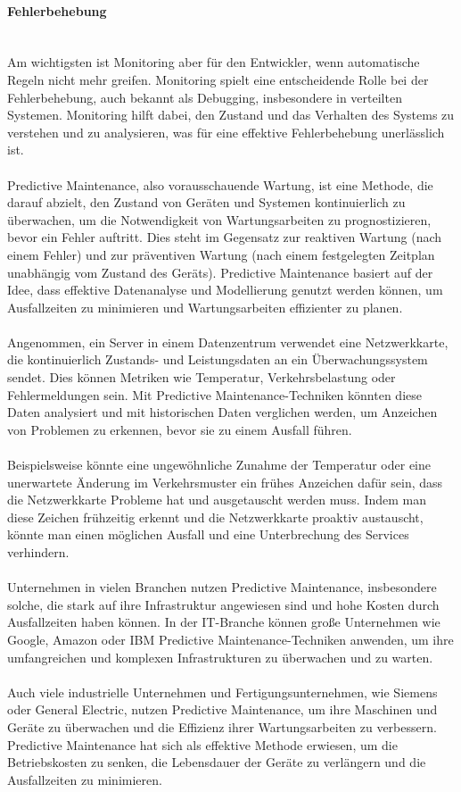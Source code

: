 \paragraph{Fehlerbehebung\\\\}
Am wichtigsten ist Monitoring aber für den Entwickler, wenn automatische Regeln nicht mehr greifen. Monitoring spielt eine entscheidende Rolle bei der Fehlerbehebung, auch bekannt als Debugging, insbesondere in verteilten Systemen. Monitoring hilft dabei, den Zustand und das Verhalten des Systems zu verstehen und zu analysieren, was für eine effektive Fehlerbehebung unerlässlich ist.
\\\\
Predictive Maintenance, also vorausschauende Wartung, ist eine Methode, die darauf abzielt, den Zustand von Geräten und Systemen kontinuierlich zu überwachen, um die Notwendigkeit von Wartungsarbeiten zu prognostizieren, bevor ein Fehler auftritt. Dies steht im Gegensatz zur reaktiven Wartung (nach einem Fehler) und zur präventiven Wartung (nach einem festgelegten Zeitplan unabhängig vom Zustand des Geräts). Predictive Maintenance basiert auf der Idee, dass effektive Datenanalyse und Modellierung genutzt werden können, um Ausfallzeiten zu minimieren und Wartungsarbeiten effizienter zu planen.
\\\\
Angenommen, ein Server in einem Datenzentrum verwendet eine Netzwerkkarte, die kontinuierlich Zustands- und Leistungsdaten an ein Überwachungssystem sendet. Dies können Metriken wie Temperatur, Verkehrsbelastung oder Fehlermeldungen sein. Mit Predictive Maintenance-Techniken könnten diese Daten analysiert und mit historischen Daten verglichen werden, um Anzeichen von Problemen zu erkennen, bevor sie zu einem Ausfall führen.
\\\\
Beispielsweise könnte eine ungewöhnliche Zunahme der Temperatur oder eine unerwartete Änderung im Verkehrsmuster ein frühes Anzeichen dafür sein, dass die Netzwerkkarte Probleme hat und ausgetauscht werden muss. Indem man diese Zeichen frühzeitig erkennt und die Netzwerkkarte proaktiv austauscht, könnte man einen möglichen Ausfall und eine Unterbrechung des Services verhindern.
\\\\
Unternehmen in vielen Branchen nutzen Predictive Maintenance, insbesondere solche, die stark auf ihre Infrastruktur angewiesen sind und hohe Kosten durch Ausfallzeiten haben können. In der IT-Branche können große Unternehmen wie Google, Amazon oder IBM Predictive Maintenance-Techniken anwenden, um ihre umfangreichen und komplexen Infrastrukturen zu überwachen und zu warten.
\\\\
Auch viele industrielle Unternehmen und Fertigungsunternehmen, wie Siemens oder General Electric, nutzen Predictive Maintenance, um ihre Maschinen und Geräte zu überwachen und die Effizienz ihrer Wartungsarbeiten zu verbessern. Predictive Maintenance hat sich als effektive Methode erwiesen, um die Betriebskosten zu senken, die Lebensdauer der Geräte zu verlängern und die Ausfallzeiten zu minimieren.

